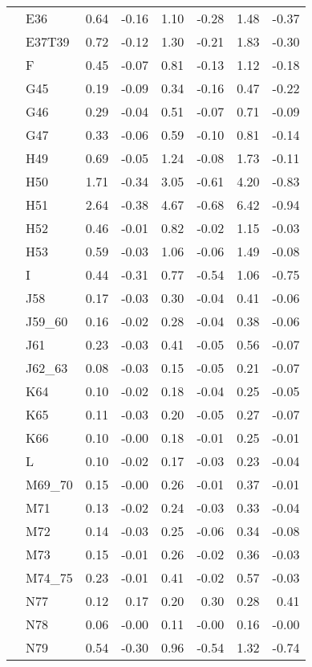 \begin{tabular}{llrrrrrr}
 & E36 & 0.64 & -0.16 & 1.10 & -0.28 & 1.48 & -0.37 \\
 & E37T39 & 0.72 & -0.12 & 1.30 & -0.21 & 1.83 & -0.30 \\
 & F & 0.45 & -0.07 & 0.81 & -0.13 & 1.12 & -0.18 \\
 & G45 & 0.19 & -0.09 & 0.34 & -0.16 & 0.47 & -0.22 \\
 & G46 & 0.29 & -0.04 & 0.51 & -0.07 & 0.71 & -0.09 \\
 & G47 & 0.33 & -0.06 & 0.59 & -0.10 & 0.81 & -0.14 \\
 & H49 & 0.69 & -0.05 & 1.24 & -0.08 & 1.73 & -0.11 \\
 & H50 & 1.71 & -0.34 & 3.05 & -0.61 & 4.20 & -0.83 \\
 & H51 & 2.64 & -0.38 & 4.67 & -0.68 & 6.42 & -0.94 \\
 & H52 & 0.46 & -0.01 & 0.82 & -0.02 & 1.15 & -0.03 \\
 & H53 & 0.59 & -0.03 & 1.06 & -0.06 & 1.49 & -0.08 \\
 & I & 0.44 & -0.31 & 0.77 & -0.54 & 1.06 & -0.75 \\
 & J58 & 0.17 & -0.03 & 0.30 & -0.04 & 0.41 & -0.06 \\
 & J59_60 & 0.16 & -0.02 & 0.28 & -0.04 & 0.38 & -0.06 \\
 & J61 & 0.23 & -0.03 & 0.41 & -0.05 & 0.56 & -0.07 \\
 & J62_63 & 0.08 & -0.03 & 0.15 & -0.05 & 0.21 & -0.07 \\
 & K64 & 0.10 & -0.02 & 0.18 & -0.04 & 0.25 & -0.05 \\
 & K65 & 0.11 & -0.03 & 0.20 & -0.05 & 0.27 & -0.07 \\
 & K66 & 0.10 & -0.00 & 0.18 & -0.01 & 0.25 & -0.01 \\
 & L & 0.10 & -0.02 & 0.17 & -0.03 & 0.23 & -0.04 \\
 & M69_70 & 0.15 & -0.00 & 0.26 & -0.01 & 0.37 & -0.01 \\
 & M71 & 0.13 & -0.02 & 0.24 & -0.03 & 0.33 & -0.04 \\
 & M72 & 0.14 & -0.03 & 0.25 & -0.06 & 0.34 & -0.08 \\
 & M73 & 0.15 & -0.01 & 0.26 & -0.02 & 0.36 & -0.03 \\
 & M74_75 & 0.23 & -0.01 & 0.41 & -0.02 & 0.57 & -0.03 \\
 & N77 & 0.12 & 0.17 & 0.20 & 0.30 & 0.28 & 0.41 \\
 & N78 & 0.06 & -0.00 & 0.11 & -0.00 & 0.16 & -0.00 \\
 & N79 & 0.54 & -0.30 & 0.96 & -0.54 & 1.32 & -0.74 \\

\end{tabular}
